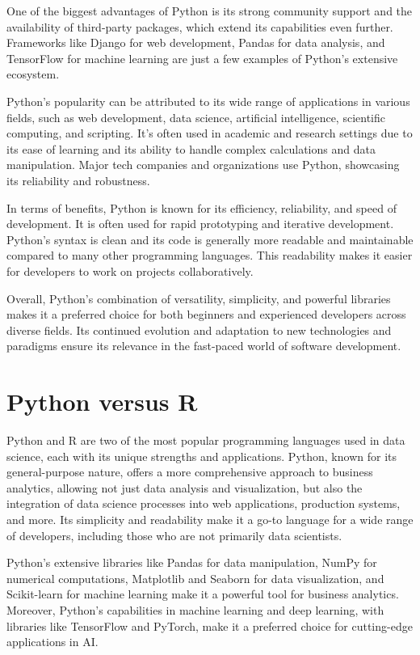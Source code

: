 One of the biggest advantages of Python is its strong community support and the availability of third-party packages, which extend its capabilities even further. Frameworks like Django for web development, Pandas for data analysis, and TensorFlow for machine learning are just a few examples of Python's extensive ecosystem.

Python's popularity can be attributed to its wide range of applications in various fields, such as web development, data science, artificial intelligence, scientific computing, and scripting. It's often used in academic and research settings due to its ease of learning and its ability to handle complex calculations and data manipulation. Major tech companies and organizations use Python, showcasing its reliability and robustness.

In terms of benefits, Python is known for its efficiency, reliability, and speed of development. It is often used for rapid prototyping and iterative development. Python's syntax is clean and its code is generally more readable and maintainable compared to many other programming languages. This readability makes it easier for developers to work on projects collaboratively.

Overall, Python's combination of versatility, simplicity, and powerful libraries makes it a preferred choice for both beginners and experienced developers across diverse fields. Its continued evolution and adaptation to new technologies and paradigms ensure its relevance in the fast-paced world of software development.

\section{Python versus R}

Python and R are two of the most popular programming languages used in data science, each with its unique strengths and applications. Python, known for its general-purpose nature, offers a more comprehensive approach to business analytics, allowing not just data analysis and visualization, but also the integration of data science processes into web applications, production systems, and more. Its simplicity and readability make it a go-to language for a wide range of developers, including those who are not primarily data scientists.

Python's extensive libraries like Pandas for data manipulation, NumPy for numerical computations, Matplotlib and Seaborn for data visualization, and Scikit-learn for machine learning make it a powerful tool for business analytics. Moreover, Python's capabilities in machine learning and deep learning, with libraries like TensorFlow and PyTorch, make it a preferred choice for cutting-edge applications in AI.

